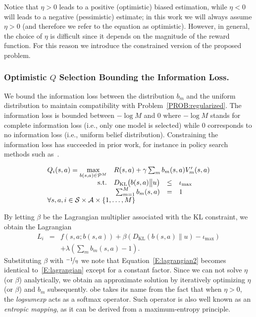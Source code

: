 Notice that $\eta>0$ leads to a positive (optimistic) biased estimation, while $\eta<0$ will leads to a negative (pessimistic) estimate; in this work we will always assume $\eta>0$ (and therefore we refer to the equation as optimistic). 
However, in general, the choice of $\eta$ is difficult since it depends on the magnitude of the reward function. For this reason we introduce the constrained version of the proposed problem.
 
\subsubsection{Optimistic $Q$ Selection Bounding the Information Loss.}
We bound the information loss between the distribution $b_m$ and the uniform distribution to maintain compatibility with Problem~\ref{PROB:regularized}. The information loss is bounded between $-\log M$ and $0$ where  $-\log M$ stands for complete information loss (i.e., only one model is selected) while $0$ corresponds to no information loss (i.e., uniform belief distribution). Constraining the information loss has succeeded in prior work, for instance in policy search methods such as~\cite{peters2010relative}.
\begin{probdef}
\begin{equation}
\begin{array}{rrclcl}
\displaystyle Q_i(s,a) = \max_{b(s,a) \in \mathcal{P}^M} & \multicolumn{3}{l}{R(s,a) + \gamma \sum_m{b}_m(s,a)V_m'(s,a)\nonumber } \\
\text{s.t.} & D_{\mathrm{KL}}\big(b(s,a)\big{\|} u \big)& \leq & \iota_{\max} \\
& \sum_{m=1}^{M} b_m(s,a) & = & 1 \\
\multicolumn{4}{l}{ \forall s,a,i \in \mathcal{S} \times \mathcal{A} \times \{1,\dots,M\}}
\end{array} \nonumber
\end{equation}\label{PROB:constrversion}
\end{probdef}
\noindent By letting $\beta$ be the Lagrangian multiplier associated with the KL constraint, we obtain the Lagrangian
\begin{eqnarray}
L_i &\! = \!& f(s,a;b(s,a)) + \beta (D_{\mathrm{KL}}(b(s,a){\|}u) - \iota_{\max}) \nonumber \\
& &   + \lambda(\sum_m b_m(s,a) - 1).\label{E:lagrangian2}
\end{eqnarray}
Substituting $\beta$ with $\nicefrac{-1}{\eta}$ we note that Equation~\ref{E:lagrangian2} becomes identical to~\ref{E:lagrangian} except for a constant factor. Since we can not solve $\eta$ (or $\beta$) analytically, we obtain an approximate solution by iteratively optimizing $\eta$ (or $\beta$) and $b_m$ subsequently.
\gls{obe} takes its name from the fact that when $\eta > 0$, the \textit{logsumexp} acts as a softmax operator. Such operator is also well known as an \textit{entropic mapping}, as it can be derived from a maximum-entropy principle.

